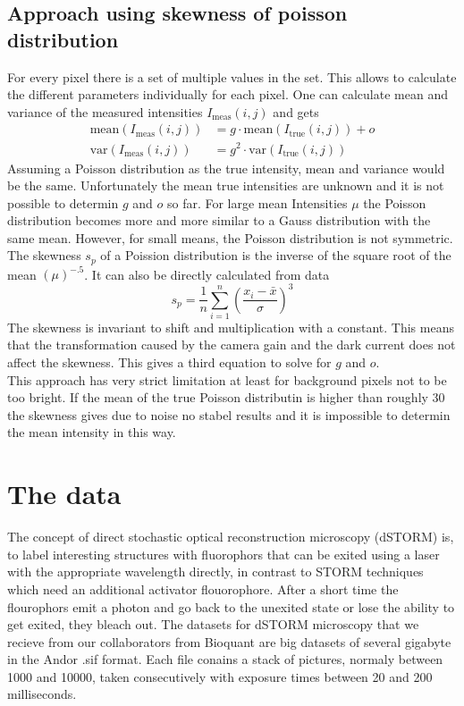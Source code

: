 \subsection{Approach using skewness of poisson distribution}
For every pixel there is a set of multiple values in the set. This allows to
calculate the different parameters individually for each pixel. One can
calculate mean and variance of the measured intensities $I_\text{meas}(i,j)$ and
gets
\begin{align}
	\text{mean}(I_\text{meas}(i,j))& = g\cdot \text{mean}(I_\text{true}(i,j)) + o \label{meanvarPoiss1}\\
	\text{var}(I_\text{meas}(i,j))& = g^2\cdot\text{var}(I_\text{true}(i,j)) \label{meanvarPoiss2}
\end{align}
Assuming a Poisson distribution as the true intensity, mean and variance would
be the same. Unfortunately the mean true intensities are unknown and it is
not possible to determin $g$ and $o$ so far. For large mean Intensities $\mu$
the Poisson distribution becomes more and more similar to a Gauss distribution
with the same mean. However, for small means, the Poisson distribution is not
symmetric. The skewness $s_p$ of a Poission distribution is the inverse of the
square root of the mean $(\mu)^{-.5}$. It can also be directly
calculated from data
\begin{equation}
	s_p = \frac{1}{n}\sum_{i = 1}^n \left(\frac{x_i - \bar x}{\sigma}\right)^3
\end{equation}
The skewness is invariant to shift and multiplication with a constant. This
means that the transformation caused by the camera gain and the dark current
does not affect the skewness. This gives a third equation to solve for $g$ and
$o$.\\
This approach has very strict limitation at least for background pixels not to be too
bright. If the mean of the true Poisson distributin is higher than
roughly 30 the skewness gives due to noise no stabel results and it is
impossible to determin the mean intensity in this way.


\section{The data}
The concept of direct stochastic optical reconstruction microscopy (dSTORM) \cite{heilemann} is, to label interesting structures with fluorophors that can be exited using a laser with the appropriate wavelength directly, in contrast to STORM techniques which need an additional activator flouorophore. After a short time the flourophors emit a photon and go back to the unexited state or lose the ability to get exited, they bleach out.
The datasets for dSTORM microscopy that we recieve from our collaborators from
Bioquant are big datasets of several gigabyte in the Andor .sif format. Each
file conains a stack of pictures, normaly between 1000 and 10000, taken
consecutively with exposure times between 20 and 200 milliseconds.\newline

